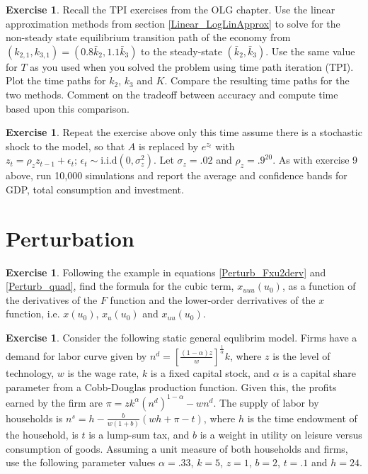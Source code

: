 \documentclass[letterpaper,12pt]{article}
\theoremstyle{definition}
\newtheorem{exercise}[theorem]{Exercise}
\begin{document}
\begin{spacing}{1.5}
	\begin{exercise} \label{Linear_HW_OLG}
		Recall the TPI exercises from the OLG chapter.  Use the linear approximation methods from section \ref{Linear_LogLinApprox} to solve for the non-steady state equilibrium transition path of the economy from $(k_{2,1},k_{3,1})=(0.8\bar{k}_2,1.1\bar{k}_3)$ to the steady-state $(\bar{k}_2,\bar{k}_3)$. Use the same value for $T$ as you used when you solved the problem using time path iteration (TPI).  Plot the time paths for $k_2$, $k_3$ and $K$.  Compare the resulting time paths for the two methods.  Comment on the tradeoff between accuracy and compute time based upon this comparison.
	\end{exercise}

	\begin{exercise} \label{Linear_HW_OLG_Stoch}
		Repeat the exercise above only this time assume there is a stochastic shock to the model, so that $A$ is replaced by $e^{z_t}$ with $z_t = \rho_z z_{t-1} + \epsilon_t;\,\epsilon_t \sim \text{i.i.d} (0,\sigma_z^2)$.  Let $\sigma_z=.02$ and $\rho_z=.9^{20}$.  As with exercise 9 above, run 10,000 simulations and report the average and confidence bands for GDP, total consumption and investment.
	\end{exercise}


\section*{Perturbation}\label{Perturb_HW} 

	\begin{exercise} \label{Perturb_HW_Cubic}
		Following the example in equations \eqref{Perturb_Fxu2derv} and \eqref{Perturb_quad}, find the formula for the cubic term, $x_{uuu}(u_0)$, as a function of the derivatives of the $F$ function and the lower-order derrivatives of the $x$ function, i.e. $x(u_0)$, $x_u(u_0)$ and $x_{uu}(u_0)$.
	\end{exercise}

	\begin{exercise} \label{Perturb_HW02_GEApprox}
		Consider the following static general equlibrim model.  Firms have a demand for labor curve given by $n^d = \left[\frac{(1-\alpha)z}{w}\right]^{\tfrac{1}{\alpha}} k$, where $z$ is the level of technology, $w$ is the wage rate, $k$ is a fixed capital stock, and $\alpha$ is a capital share parameter from a Cobb-Douglas production function.  Given this, the profits earned by the firm are $\pi = zk^\alpha (n^d)^{1-\alpha} - w n^d$.  The supply of labor by households is $n^s = h - \frac{b}{w(1+b)}(wh+\pi-t)$, where $h$ is the time endowment of the household, is $t$ is a lump-sum tax, and $b$ is a weight in utility on leisure versus consumption of goods.  Assuming a unit measure of both households and firms, use the following parameter values $\alpha = .33$, $k=5$, $z=1$, $b=2$, $t=.1$ and $h=24$.


\end{exercise}
\end{spacing}
\end{document}

